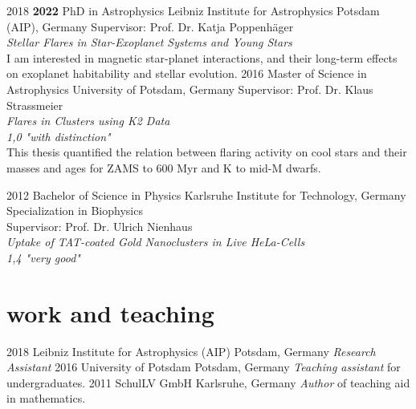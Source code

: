 \documentclass[]{k-cv} %
\begin{document}
\begin{entrylist}
\entry
{2018 \to \textbf{2022}}
{PhD {\normalfont in Astrophysics}}
{Leibniz Institute for Astrophysics Potsdam (AIP), Germany}
{Supervisor: Prof. Dr. Katja Poppenh\"ager\\
\emph{Stellar Flares in Star-Exoplanet Systems and Young Stars} \vspace{0.2cm}\\ I am interested in magnetic star-planet interactions, and their long-term effects on exoplanet habitability and stellar evolution.}
\entry
{2016 }
{Master {\normalfont of Science in Astrophysics}}
{University of Potsdam, Germany}
{Supervisor: Prof. Dr. Klaus Strassmeier\\
\emph{Flares in Clusters using K2 Data} \\ 
\emph{1,0 "with distinction"}\vspace{0.2cm}\\
This thesis quantified the relation between flaring activity on cool stars and their masses and ages for ZAMS to 600 Myr and K to mid-M dwarfs.}


\entry
{2012 }
{Bachelor {\normalfont of Science in Physics}}
{Karlsruhe Institute for Technology, Germany}
{Specialization in Biophysics\\
Supervisor: Prof. Dr. Ulrich Nienhaus\\
\emph{Uptake of TAT-coated Gold Nanoclusters in Live HeLa-Cells}\\
\emph{1,4 "very good"}}
\end{entrylist}

\section{work and teaching}

\begin{entrylist}

\entry
{2018}
{Leibniz Institute for Astrophysics (AIP)}
{Potsdam, Germany}
{\emph{Research Assistant}}
\entry
{2016 }
{University of Potsdam}
{Potsdam, Germany}
{\emph{Teaching assistant} for undergraduates.}
\entry
{2011 }
{SchulLV GmbH}
{Karlsruhe, Germany}
{\emph{Author} of teaching aid in mathematics.}
\end{entrylist}
\end{document}
